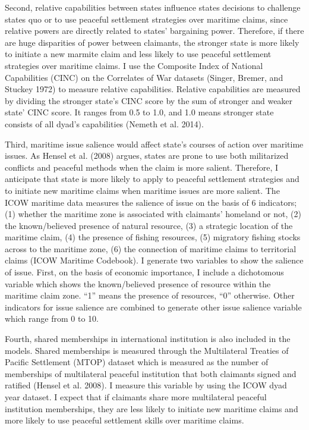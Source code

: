 \documentclass{article}
\begin{document}
Second, relative capabilities between states influence states decisions to challenge states quo or to use peaceful settlement strategies over maritime claims, since relative powers are directly related to states’ bargaining power. Therefore, if there are huge disparities of power between claimants, the stronger state is more likely to initiate a new marmite claim and less likely to use peaceful settlement strategies over maritime claims. I use the Composite Index of National Capabilities (CINC) on the Correlates of War datasets (Singer, Bremer, and Stuckey 1972) to measure relative capabilities. Relative capabilities are measured by dividing the stronger state’s CINC score by the sum of stronger and weaker state’ CINC score. It ranges from 0.5 to 1.0, and 1.0 means stronger state consists of all dyad’s capabilities (Nemeth et al. 2014).

Third, maritime issue salience would affect state’s courses of action over maritime issues. As Hensel et al. (2008) argues, states are prone to use both militarized conflicts and peaceful methods when the claim is more salient. Therefore, I anticipate that state is more likely to apply to peaceful settlement strategies and to initiate new maritime claims when maritime issues are more salient. The ICOW maritime data measures the salience of issue on the basis of 6 indicators; (1) whether the maritime zone is associated with claimants’ homeland or not, (2) the known/believed presence of natural resource, (3) a strategic location of the maritime claim, (4) the presence of fishing resources, (5) migratory fishing stocks across to the maritime zone, (6) the connection of maritime claims to territorial claims (ICOW Maritime Codebook). I generate two variables to show the salience of issue. First, on the basis of economic importance, I include a dichotomous variable which shows the known/believed presence of resource within the maritime claim zone. “1” means the presence of resources, “0” otherwise. Other indicators for issue salience are combined to generate other issue salience variable which range from 0 to 10.

Fourth, shared memberships in international institution is also included in the models. Shared memberships is measured through the Multilateral Treaties of Pacific Settlement (MTOP) dataset which is measured as the number of memberships of multilateral peaceful institution that both claimants signed and ratified (Hensel et al. 2008). I measure this variable by using the ICOW dyad year dataset. I expect that if claimants share more multilateral peaceful institution memberships, they are less likely to initiate new maritime claims and more likely to use peaceful settlement skills over maritime claims.
\end{document}
